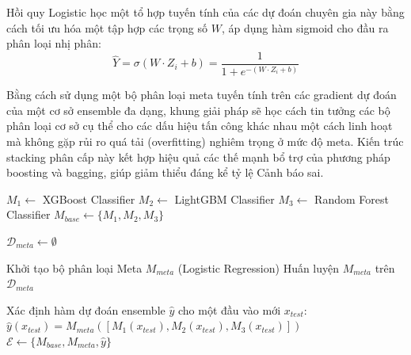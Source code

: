 Hồi quy Logistic học một tổ hợp tuyến tính của các dự đoán chuyên gia này bằng cách tối ưu hóa một tập hợp các trọng số $W$, áp dụng hàm sigmoid cho đầu ra phân loại nhị phân:
\begin{equation}
    \hat{Y} = \sigma(W \cdot Z_i + b) = \frac{1}{1 + e^{-(W \cdot Z_i + b)}}
\end{equation}

Bằng cách sử dụng một bộ phân loại meta tuyến tính trên các gradient dự đoán của một cơ sở ensemble đa dạng, khung giải pháp sẽ học cách tin tưởng các bộ phân loại cơ sở cụ thể cho các dấu hiệu tấn công khác nhau một cách linh hoạt mà không gặp rủi ro quá tải (overfitting) nghiêm trọng ở mức độ meta. Kiến trúc stacking phân cấp này kết hợp hiệu quả các thế mạnh bổ trợ của phương pháp boosting và bagging, giúp giảm thiểu đáng kể tỷ lệ Cảnh báo sai.

\begin{algorithm}[hbt!]
\SetAlgoLined
{}

$M_1 \leftarrow$ XGBoost Classifier\;
$M_2 \leftarrow$ LightGBM Classifier\;
$M_3 \leftarrow$ Random Forest Classifier\;
$M_{base} \leftarrow \{M_1, M_2, M_3\}$\;

$\mathcal{D}_{meta} \leftarrow \emptyset$\;


Khởi tạo bộ phân loại Meta $M_{meta}$ (Logistic Regression)\;
Huấn luyện $M_{meta}$ trên $\mathcal{D}_{meta}$\;

Xác định hàm dự đoán ensemble $\hat{y}$ cho một đầu vào mới $x_{test}$:\;
$\hat{y}(x_{test}) = M_{meta} \left( [M_1(x_{test}), M_2(x_{test}), M_3(x_{test})] \right)$\;
$\mathcal{E} \leftarrow \{M_{base}, M_{meta}, \hat{y}\}$\;

\caption{Huấn luyện mô hình Ensemble lai (XGBoost, LightGBM, Random Forest)}
\label{algo:ensemble}
\end{algorithm}

